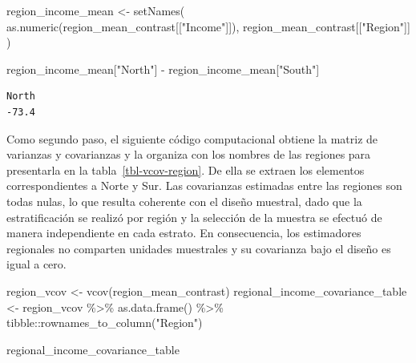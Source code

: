 \documentclass[
  spanish,
  11pt,
  letterpaper,
  oneside,
  open=any]{scrbook}
\newenvironment{Shaded}{\begin{snugshade}}{\end{snugshade}}
\newcommand{\FunctionTok}[1]{\textcolor[rgb]{0.28,0.35,0.67}{#1}}
\newcommand{\NormalTok}[1]{\textcolor[rgb]{0.00,0.23,0.31}{#1}}
\newcommand{\OtherTok}[1]{\textcolor[rgb]{0.00,0.23,0.31}{#1}}
\newcommand{\SpecialCharTok}[1]{\textcolor[rgb]{0.37,0.37,0.37}{#1}}
\newcommand{\StringTok}[1]{\textcolor[rgb]{0.13,0.47,0.30}{#1}}
\begin{document}
\begin{Shaded}
\begin{Highlighting}[]
\NormalTok{region\_income\_mean }\OtherTok{\textless{}{-}} \FunctionTok{setNames}\NormalTok{(}
  \FunctionTok{as.numeric}\NormalTok{(region\_mean\_contrast[[}\StringTok{"Income"}\NormalTok{]]),}
\NormalTok{  region\_mean\_contrast[[}\StringTok{"Region"}\NormalTok{]]}
\NormalTok{)}

\NormalTok{region\_income\_mean[}\StringTok{"North"}\NormalTok{] }\SpecialCharTok{{-}}\NormalTok{ region\_income\_mean[}\StringTok{"South"}\NormalTok{]}
\end{Highlighting}
\end{Shaded}

\begin{verbatim}
North 
-73.4 
\end{verbatim}

Como segundo paso, el siguiente código computacional obtiene la matriz
de varianzas y covarianzas y la organiza con los nombres de las regiones
para presentarla en la tabla~\ref{tbl-vcov-region}. De ella se extraen
los elementos correspondientes a Norte y Sur. Las covarianzas estimadas
entre las regiones son todas nulas, lo que resulta coherente con el
diseño muestral, dado que la estratificación se realizó por región y la
selección de la muestra se efectuó de manera independiente en cada
estrato. En consecuencia, los estimadores regionales no comparten
unidades muestrales y su covarianza bajo el diseño es igual a cero.

\begin{Shaded}
\begin{Highlighting}[]
\NormalTok{region\_vcov }\OtherTok{\textless{}{-}} \FunctionTok{vcov}\NormalTok{(region\_mean\_contrast)}
\NormalTok{regional\_income\_covariance\_table }\OtherTok{\textless{}{-}}\NormalTok{ region\_vcov }\SpecialCharTok{\%\textgreater{}\%}
  \FunctionTok{as.data.frame}\NormalTok{() }\SpecialCharTok{\%\textgreater{}\%}
\NormalTok{  tibble}\SpecialCharTok{::}\FunctionTok{rownames\_to\_column}\NormalTok{(}\StringTok{"Region"}\NormalTok{)}

\NormalTok{regional\_income\_covariance\_table}
\end{Highlighting}
\end{Shaded}
\end{document}
